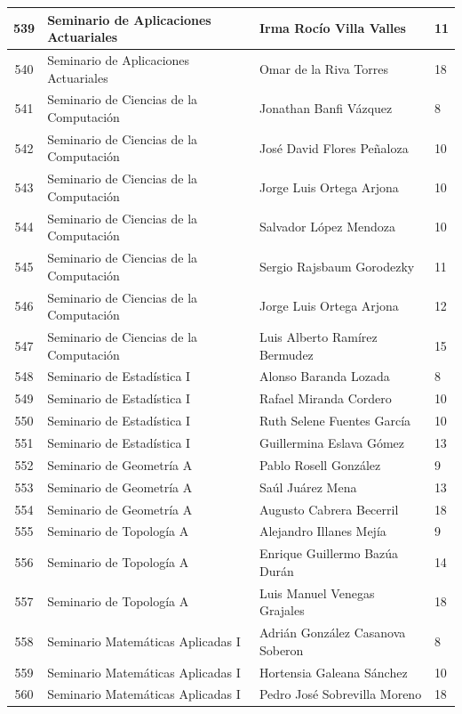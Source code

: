 {\begin{longtable}{|c|p{6.5cm}|p{5cm}|p{1.5cm}|}
539 & Seminario de Aplicaciones Actuariales & Irma Rocío Villa Valles & 11 \\ \hline
540 & Seminario de Aplicaciones Actuariales & Omar de la Riva Torres & 18 \\ \hline
541 & Seminario de Ciencias de la Computación & Jonathan Banfi Vázquez & 8 \\ \hline
542 & Seminario de Ciencias de la Computación & José David Flores Peñaloza & 10 \\ \hline
543 & Seminario de Ciencias de la Computación & Jorge Luis Ortega Arjona & 10 \\ \hline
544 & Seminario de Ciencias de la Computación & Salvador López Mendoza & 10 \\ \hline
545 & Seminario de Ciencias de la Computación & Sergio Rajsbaum Gorodezky & 11 \\ \hline
546 & Seminario de Ciencias de la Computación & Jorge Luis Ortega Arjona & 12 \\ \hline
547 & Seminario de Ciencias de la Computación & Luis Alberto Ramírez Bermudez & 15 \\ \hline
548 & Seminario de Estadística I & Alonso Baranda Lozada & 8 \\ \hline
549 & Seminario de Estadística I & Rafael Miranda Cordero & 10 \\ \hline
550 & Seminario de Estadística I & Ruth Selene Fuentes García & 10 \\ \hline
551 & Seminario de Estadística I & Guillermina Eslava Gómez & 13 \\ \hline
552 & Seminario de Geometría A & Pablo Rosell González & 9 \\ \hline
553 & Seminario de Geometría A & Saúl Juárez Mena & 13 \\ \hline
554 & Seminario de Geometría A & Augusto Cabrera Becerril & 18 \\ \hline
555 & Seminario de Topología A & Alejandro Illanes Mejía & 9 \\ \hline
556 & Seminario de Topología A & Enrique Guillermo Bazúa Durán & 14 \\ \hline
557 & Seminario de Topología A & Luis Manuel Venegas Grajales & 18 \\ \hline
558 & Seminario Matemáticas Aplicadas I & Adrián González Casanova Soberon & 8 \\ \hline
559 & Seminario Matemáticas Aplicadas I & Hortensia Galeana Sánchez & 10 \\ \hline
560 & Seminario Matemáticas Aplicadas I & Pedro José Sobrevilla Moreno & 18 \\ \hline

\end{longtable}}
